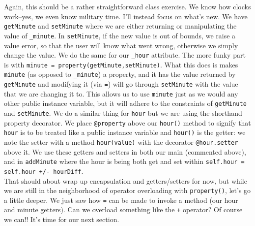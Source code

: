 \documentclass[12pt]{article}
\begin{document}
Again, this should be a rather straightforward class exercise. We know how clocks work--yes, we even know military time. I'll instead focus on what's new. We have \texttt{getMinute} and \texttt{setMinute} where we are either returning or manipulating the value of \texttt{\_minute}. In \texttt{setMinute}, if the new value is out of bounds, we raise a value error, so that the user will know what went wrong, otherwise we simply change the value. We do the same for our \texttt{\_hour} attribute. The more funky part is with \texttt{minute = property(getMinute,setMinute)}. What this does is makes \texttt{minute} (as opposed to \texttt{\_minute}) a property, and it has the value returned by \texttt{getMinute} and modifying it (via \texttt{=}) will go through \texttt{setMinute} with the value that we are changing it to. This allows us to use \texttt{minute} just as we would any other public instance variable, but it will adhere to the constraints of \texttt{getMinute} and \texttt{setMinute}. We do a similar thing for \texttt{hour} but we are using the shorthand property decorator. We place \texttt{@property} above our \texttt{hour()} method to signify that \texttt{hour} is to be treated like a public instance variable and \texttt{hour()} is the getter: we note the setter with a method \texttt{hour(value)} with the decorator \texttt{@hour.setter} above it. We use these getters and setters in both our main (commented above), and in \texttt{addMinute} where the hour is being both get and set within \texttt{self.hour = self.hour +/- hourDiff}.\\
That should about wrap up encapsulation and getters/setters for now, but while we are still in the neighborhood of operator overloading with \texttt{property()}, let's go a little deeper. We just saw how \texttt{=} can be made to invoke a method (our hour and minute getters). Can we overload something like the \texttt{+} operator? Of course we can!! It's time for our next section.\\

\\
\end{document}
